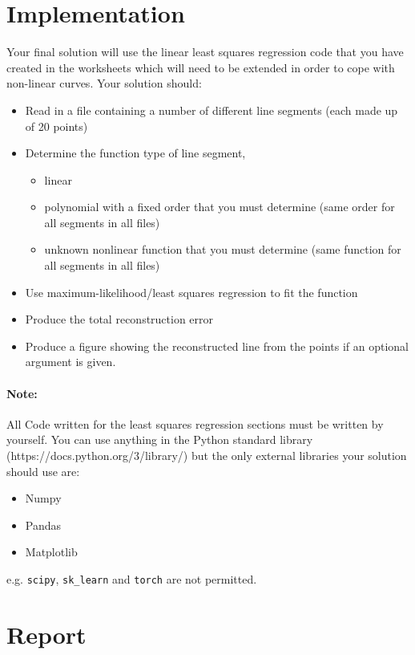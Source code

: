 \documentclass[10pt]{article}
\begin{document}
\section{Implementation}
\label{sec:implementation}
Your final solution will use the linear least squares regression code that you have created in the worksheets which will need to be extended in order to cope with non-linear curves.
Your solution should:
\begin{itemize}
  \item Read in a file containing a number of different line segments (each made up of 20 points)
  \item Determine the function type of line segment, 
  \begin{itemize}
    \item linear
    \item polynomial with a fixed order that you must determine (same order for all segments in all files)
    \item unknown nonlinear function that you must determine (same function for all segments in all files)
  \end{itemize}
  \item Use maximum-likelihood/least squares regression to fit the function
  \item Produce the total reconstruction error 
  \item Produce a figure showing the reconstructed line from the points if an optional argument is given. 
\end{itemize}

\paragraph{Note:} All Code written for the least squares regression sections must be written by yourself.
You can use anything in the Python standard library (https://docs.python.org/3/library/) but the only external libraries your solution should use are:
\begin{itemize}
  \item Numpy
  \item Pandas
  \item Matplotlib
\end{itemize}
e.g. \texttt{scipy}, \texttt{sk\_learn} and \texttt{torch} are not permitted.

\section{Report}
\end{document}
